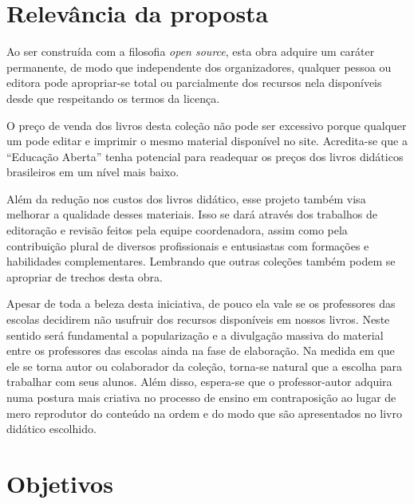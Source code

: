 \documentclass[10 pt]{article}
\begin{document}
%
%


\section{Relevância da proposta}

Ao ser construída com a filosofia {\it open source}, esta obra adquire um caráter permanente, de modo que independente dos organizadores, qualquer pessoa ou editora pode apropriar-se total ou parcialmente dos recursos nela disponíveis desde que respeitando os termos da licença. %

O preço de venda dos livros desta coleção não pode ser excessivo porque qualquer um pode editar e imprimir o mesmo material disponível no site.
Acredita-se que a ``Educação Aberta'' tenha potencial para readequar os preços dos livros didáticos brasileiros em um nível mais baixo.

Além da redução nos custos dos livros didático, esse projeto também visa melhorar a qualidade desses materiais.
Isso se dará através dos trabalhos de editoração e revisão feitos pela equipe coordenadora, assim como pela contribuição plural de diversos profissionais e entusiastas com formações e habilidades complementares.
Lembrando que outras coleções também podem se apropriar de trechos desta obra.

Apesar de toda a beleza desta iniciativa, de pouco ela vale se os professores das escolas decidirem não usufruir dos recursos disponíveis em nossos livros.
Neste sentido será fundamental a popularização e a divulgação massiva do material entre os professores das escolas ainda na fase de elaboração.
Na medida em que ele se torna autor ou colaborador da coleção, torna-se natural que a escolha para trabalhar com seus alunos.
Além disso, espera-se que o professor-autor adquira numa postura mais criativa no processo de ensino em contraposição ao lugar de mero reprodutor do conteúdo na ordem e do modo que são apresentados no livro didático escolhido.

\section{Objetivos}
\end{document}
